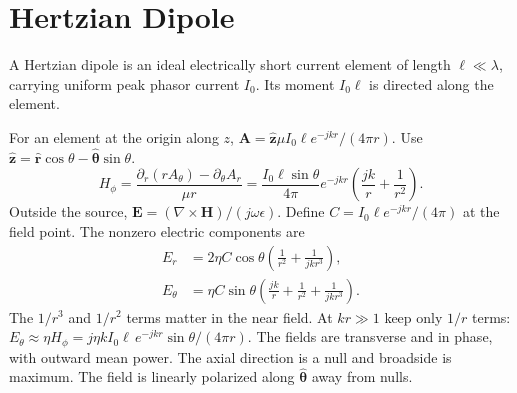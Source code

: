 \documentclass[12pt,a4paper]{article}
\begin{document}
\section{Hertzian Dipole}
\begin{tcolorbox}[defbox,title={Hertzian dipole}]
A Hertzian dipole is an ideal electrically short current element of length $\ell\ll\lambda$, carrying uniform peak phasor current $I_0$. Its moment $I_0\ell$ is directed along the element.
\end{tcolorbox}

For an element at the origin along $z$, $\mathbf A=\hat{\mathbf z}\mu I_0\ell e^{-jkr}/(4\pi r)$. Use $\hat{\mathbf z}=\hat{\mathbf r}\cos\theta-\hat{\boldsymbol\theta}\sin\theta$.
\[
H_\phi=\frac{\partial_r(r A_\theta)-\partial_\theta A_r}{\mu r}
  =\frac{I_0\ell\sin\theta}{4\pi}e^{-jkr}
   \left(\frac{jk}{r}+\frac{1}{r^2}\right).
\]
Outside the source, $\mathbf E=(\nabla\times\mathbf H)/(j\omega\epsilon)$. Define $C=I_0\ell e^{-jkr}/(4\pi)$ at the field point. The nonzero electric components are
\[
\begin{aligned}
E_r&=2\eta C\cos\theta\left(\frac{1}{r^2}+\frac{1}{jk r^3}\right),\\
E_\theta&=\eta C\sin\theta\left(\frac{jk}{r}+\frac{1}{r^2}+\frac{1}{jk r^3}\right).
\end{aligned}
\]
The $1/r^3$ and $1/r^2$ terms matter in the near field. At $kr\gg1$ keep only $1/r$ terms: $E_\theta\approx\eta H_\phi=j\eta k I_0\ell\,e^{-jkr}\sin\theta/(4\pi r)$. The fields are transverse and in phase, with outward mean power. The axial direction is a null and broadside is maximum. The field is linearly polarized along $\hat{\boldsymbol\theta}$ away from nulls.
\begin{tcolorbox}[tikzbox,title={Hertzian dipole and normalized elevation-plane power pattern},unbreakable]
\centering
{}
\end{tcolorbox}
\end{document}
